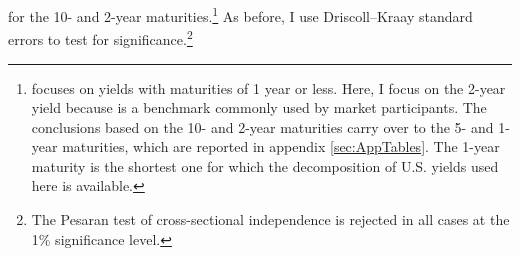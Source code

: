 {for the 10- and 2-year maturities.\footnote{ \cite{Kalemli-Ozcan:2019} focuses on yields with maturities of 1 year or less. Here, I focus on the 2-year yield because is a benchmark commonly used by market participants. The conclusions based on the 10- and 2-year maturities carry over to the 5- and 1-year maturities, which are reported in appendix \ref{sec:AppTables}. The 1-year maturity is the shortest one for which the decomposition of U.S. yields used here is available.}
As before, I use Driscoll--Kraay standard errors to test for significance.\footnote{ The Pesaran test of cross-sectional independence is rejected in all cases at the 1\% significance level.} %


}
